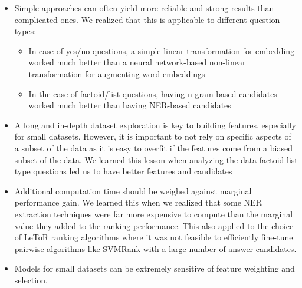 \begin{itemize}

    \item Simple approaches can often yield more reliable and strong results than complicated ones. We realized that this is applicable to different question types:
    \begin{itemize}
        \item In case of yes/no questions, a simple linear transformation for embedding worked much better than a neural network-based non-linear transformation for augmenting word embeddings
        \item In the case of factoid/list questions, having n-gram based candidates worked much better than having NER-based candidates
    \end{itemize}
    \item A long and in-depth dataset exploration is key to building features, especially for small datasets. However, it is important to not rely on specific aspects of a subset of the data as it is easy to overfit if the features come from a biased subset of the data. We learned this lesson when analyzing the data factoid-list type questions led us to have better features and candidates
    \item Additional computation time should be weighed against marginal performance gain. We learned this when we realized that some NER extraction techniques were far more expensive to compute than the marginal value they added to the ranking performance. This also applied to the choice of LeToR ranking algorithms where it was not feasible to efficiently fine-tune pairwise algorithms like SVMRank with a large number of answer candidates.
    \item Models for small datasets can be extremely sensitive of feature weighting and selection. 

\end{itemize}
